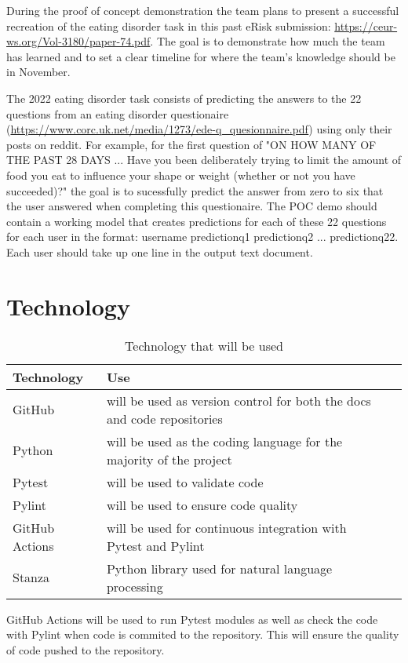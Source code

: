 \documentclass{article}
\begin{document}
During the proof of concept demonstration the team plans to present a successful recreation of the eating disorder task in this past eRisk submission: \url{https://ceur-ws.org/Vol-3180/paper-74.pdf}. The goal is to demonstrate how much the team has learned and to set a clear timeline for where the team's knowledge should be in November. 

The 2022 eating disorder task consists of predicting the answers to the 22 questions from an eating disorder questionaire (\url{https://www.corc.uk.net/media/1273/ede-q_quesionnaire.pdf}) using only their posts on reddit. For example, for the first question of 
"ON HOW MANY OF THE PAST 28 DAYS ... Have you been deliberately trying to limit the amount of food you eat to influence your shape or weight (whether or not you have succeeded)?" the goal is to sucessfully predict the answer 
from zero to six that the user answered when completing this questionaire. The POC demo should contain a working model
 that creates predictions for each of these 22 questions for each user in the format: username predictionq1 
 predictionq2 ... predictionq22. Each user should take up one line in the output text document.

\section{Technology}

\begin{table}[hp]
	\caption{Technology that will be used} \label{TblTechnology}
	\begin{tabularx}{\textwidth}{llX}
	\toprule
	\textbf{Technology} & \textbf{Use}\\
	\midrule
	GitHub & will be used as version control for both the docs and code repositories\\
	Python & will be used as the coding language for the majority of the project\\
	Pytest & will be used to validate code\\
	Pylint & will be used to ensure code quality\\
	GitHub Actions & will be used for continuous integration with Pytest and Pylint\\
	Stanza & Python library used for natural language processing\\
	\bottomrule
	\end{tabularx}
\end{table}

GitHub Actions will be used to run Pytest modules as well as check the code with Pylint when code is commited to the repository.
This will ensure the quality of code pushed to the repository.
\end{document}
